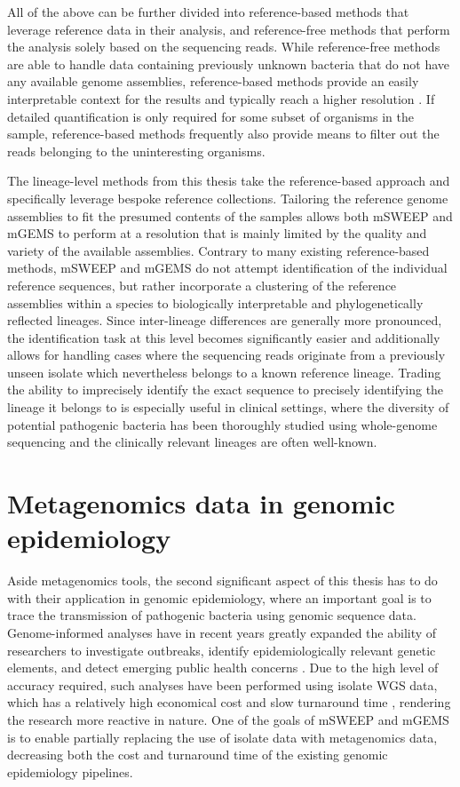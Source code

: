 \documentclass[officiallayout]{tktla}
\begin{document}
All of the above can be further divided into reference-based methods
that leverage reference data in their analysis, and reference-free
methods that perform the analysis solely based on the sequencing
reads. While reference-free methods are able to handle data containing
previously unknown bacteria that do not have any available genome
assemblies, reference-based methods provide an easily interpretable
context for the results and typically reach a higher resolution
\citep{hiraoka2016metagenomics, thomas2012metagenomics}. If detailed
quantification is only required for some subset of organisms in the
sample, reference-based methods frequently also provide means to
filter out the reads belonging to the uninteresting organisms.

The lineage-level methods from this thesis take the reference-based
approach and specifically leverage bespoke reference
collections. Tailoring the reference genome assemblies to fit the
presumed contents of the samples allows both mSWEEP and mGEMS to
perform at a resolution that is mainly limited by the quality and
variety of the available assemblies. Contrary to many existing
reference-based methods, mSWEEP and mGEMS do not attempt
identification of the individual reference sequences, but rather
incorporate a clustering of the reference assemblies within a species
to biologically interpretable and phylogenetically reflected
lineages. Since inter-lineage differences are generally more
pronounced, the identification task at this level becomes
significantly easier \citep{sankar2016bayesian} and additionally
allows for handling cases where the sequencing reads originate from a
previously unseen isolate which nevertheless belongs to a known
reference lineage. Trading the ability to imprecisely identify the
exact sequence to precisely identifying the lineage it belongs to is
especially useful in clinical settings, where the diversity of
potential pathogenic bacteria has been thoroughly studied using
whole-genome sequencing and the clinically relevant
lineages are often well-known.

\section{Metagenomics data in genomic epidemiology}

Aside metagenomics tools, the second significant aspect of this thesis
has to do with their application in genomic epidemiology, where an
important goal is to trace the transmission of pathogenic bacteria
using genomic sequence data. Genome-informed analyses have in recent
years greatly expanded the ability of researchers to investigate
outbreaks, identify epidemiologically relevant genetic elements, and
detect emerging public health concerns \citep{tang2017infection,
  van2019status, grad2014epidemiologic, kwong2015whole}. Due to the
high level of accuracy required, such analyses have been performed
using isolate WGS data, which has a relatively high economical cost
and slow turnaround time \citep{rossen2018practical}, rendering the
research more reactive in nature. One of the goals of mSWEEP and mGEMS
is to enable partially replacing the use of isolate data with
metagenomics data, decreasing both the cost and turnaround time of the
existing genomic epidemiology pipelines.
\end{document}
